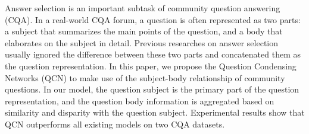 Answer selection is an important subtask of community question answering (CQA). In a real-world CQA forum, a question is often represented as two parts: a subject that summarizes the main points of the question, and a body that elaborates on the subject in detail. Previous researches on answer selection usually ignored the difference between these two parts and concatenated them as the question representation. In this paper, we propose the Question Condensing Networks (QCN) to make use of the subject-body relationship of community questions. In our model, the question subject is the primary part of the question representation, and the question body information is aggregated based on similarity and disparity with the question subject. Experimental results show that QCN outperforms all existing models on two CQA datasets.
